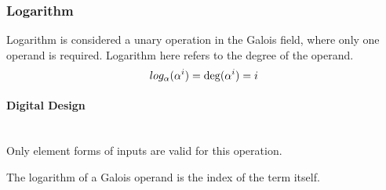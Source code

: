 \subsubsection{Logarithm} Logarithm is considered a unary operation in the
Galois field, where only one operand is required. Logarithm here refers to the degree of the operand.
    \begin{equation*}
        log_{\alpha}(\alpha^{i}) = \deg(\alpha^{i}) = i \\
    \end{equation*}

    \paragraph{{\small Digital Design}} \leavevmode \\ Only element forms of
    inputs are valid for this operation.

    The logarithm of a Galois operand is the index of the term itself.
